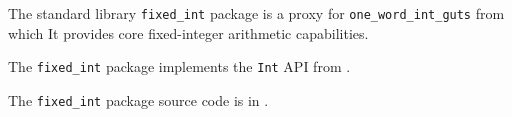 
The standard library {\tt fixed\_int} package is a proxy for {\tt one\_word\_int\_guts} from 
 which 
It provides core fixed-integer arithmetic capabilities.

The {\tt fixed\_int} package 
implements the {\tt Int} API from .

The {\tt fixed\_int} package source code is in .
